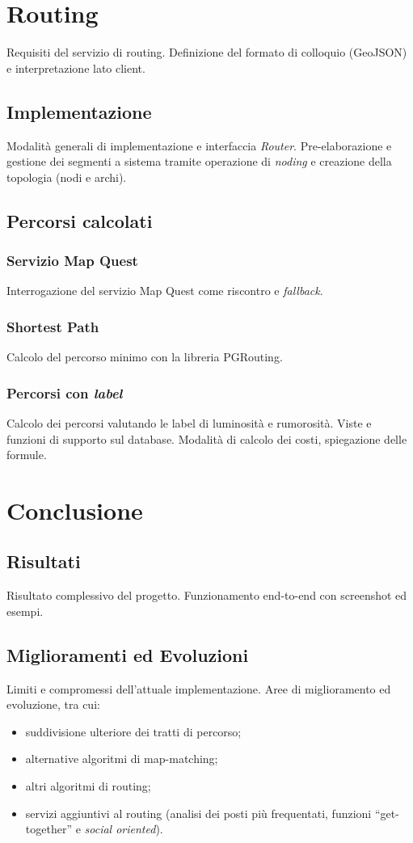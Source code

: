 \documentclass[a4paper, 12pt, twoside, openright]{book}
\begin{document}
\chapter{Routing} %
Requisiti del servizio di routing. Definizione del formato di colloquio (GeoJSON) e interpretazione lato client.
\section{Implementazione}
Modalità generali di implementazione e interfaccia \emph{Router}.
Pre-elaborazione e gestione dei segmenti a sistema tramite operazione di \emph{noding} e creazione della topologia (nodi e archi).
\section{Percorsi calcolati}
\subsection{Servizio Map Quest}
Interrogazione del servizio Map Quest come riscontro e \emph{fallback}. 
\subsection{Shortest Path}
Calcolo del percorso minimo con la libreria PGRouting.
\subsection{Percorsi con \emph{label}}
Calcolo dei percorsi valutando le label di luminosità e rumorosità. Viste e funzioni di supporto sul database. Modalità di calcolo dei costi, spiegazione delle formule.

\chapter{Conclusione} %
\section{Risultati}
Risultato complessivo del progetto. Funzionamento end-to-end con screenshot ed esempi.
\section{Miglioramenti ed Evoluzioni}
Limiti e compromessi dell'attuale implementazione. Aree di miglioramento ed evoluzione, tra cui:
\begin{itemize}
\item suddivisione ulteriore dei tratti di percorso;
\item alternative algoritmi di map-matching;
\item altri algoritmi di routing;
\item servizi aggiuntivi al routing (analisi dei posti più frequentati, funzioni ``get-together'' e \emph{social oriented}).
\end{itemize}

\backmatter

\begingroup %
  \makeatletter
  \let\ps@plain\ps@empty
  \makeatother
  
\endgroup
\end{document}
